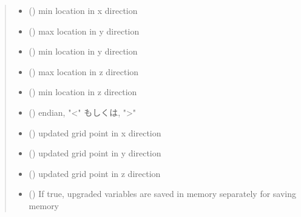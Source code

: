 \documentclass[letterpaper,10pt,dvipdfmx,report]{sphinxmanual}
\begin{document}
\begin{fulllineitems}
\begin{quote}
\begin{description}
\begin{itemize}
\item {} 
\sphinxAtStartPar
{} () \sphinxhyphen{}\sphinxhyphen{} min location in x direction

\item {} 
\sphinxAtStartPar
{} () \sphinxhyphen{}\sphinxhyphen{} max location in y direction

\item {} 
\sphinxAtStartPar
{} () \sphinxhyphen{}\sphinxhyphen{} min location in y direction

\item {} 
\sphinxAtStartPar
{} () \sphinxhyphen{}\sphinxhyphen{} max location in z direction

\item {} 
\sphinxAtStartPar
{} () \sphinxhyphen{}\sphinxhyphen{} min location in z direction

\item {} 
\sphinxAtStartPar
{} () \sphinxhyphen{}\sphinxhyphen{} endian, "\textless{}" もしくは, "\textgreater{}"

\item {} 
\sphinxAtStartPar
{} () \sphinxhyphen{}\sphinxhyphen{} updated grid point in x direction

\item {} 
\sphinxAtStartPar
{} () \sphinxhyphen{}\sphinxhyphen{} updated grid point in y direction

\item {} 
\sphinxAtStartPar
{} () \sphinxhyphen{}\sphinxhyphen{} updated grid point in z direction

\item {} 
\sphinxAtStartPar
{} () \sphinxhyphen{}\sphinxhyphen{} If true, upgraded variables are saved in memory separately for saving memory


\end{itemize}
\end{description}
\end{quote}
\end{fulllineitems}
\end{document}
